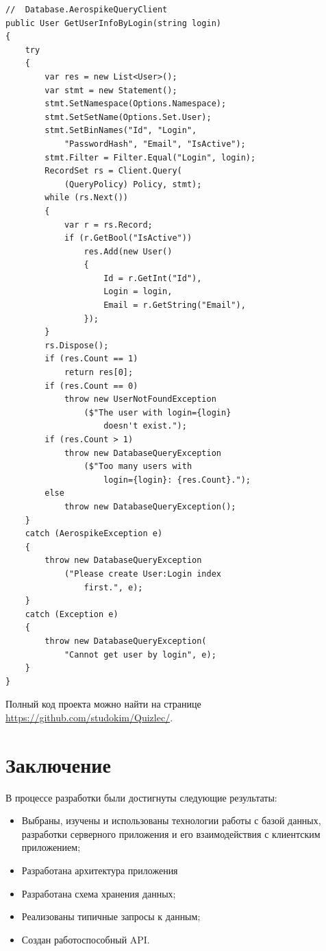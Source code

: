 \documentclass[14pt]{matmex-diploma-custom}
\begin{document}
\lstset{style=sharpc}
\begin{lstlisting}
//  Database.AerospikeQueryClient
public User GetUserInfoByLogin(string login)
{
    try
    {
        var res = new List<User>();
        var stmt = new Statement();
        stmt.SetNamespace(Options.Namespace);
        stmt.SetSetName(Options.Set.User);
        stmt.SetBinNames("Id", "Login",
            "PasswordHash", "Email", "IsActive");
        stmt.Filter = Filter.Equal("Login", login);
        RecordSet rs = Client.Query(
            (QueryPolicy) Policy, stmt);
        while (rs.Next())
        {
            var r = rs.Record;
            if (r.GetBool("IsActive"))
                res.Add(new User()
                {
                    Id = r.GetInt("Id"),
                    Login = login,
                    Email = r.GetString("Email"),
                });
        }
        rs.Dispose();
        if (res.Count == 1)
            return res[0];
        if (res.Count == 0)
            throw new UserNotFoundException
                ($"The user with login={login}
                    doesn't exist.");
        if (res.Count > 1)
            throw new DatabaseQueryException
                ($"Too many users with
                    login={login}: {res.Count}.");
        else
            throw new DatabaseQueryException();
    }
    catch (AerospikeException e)
    {
        throw new DatabaseQueryException
            ("Please create User:Login index
                first.", e);
    }
    catch (Exception e)
    {
        throw new DatabaseQueryException(
            "Cannot get user by login", e);
    }
}
\end{lstlisting}

Полный код проекта можно найти на странице \url{https://github.com/studokim/Quizlec/}.

\section*{Заключение}
В процессе разработки были достигнуты следующие результаты:
\begin{itemize}
    \item Выбраны, изучены и использованы технологии работы с базой данных, разработки серверного приложения и его взаимодействия с клиентским приложением;
    \item Разработана архитектура приложения
    \item Разработана схема хранения данных;
    \item Реализованы типичные запросы к данным;
    \item Создан работоспособный API.
\end{itemize}
\setmonofont[Mapping=tex-text]{CMU Typewriter Text}


\end{document}
